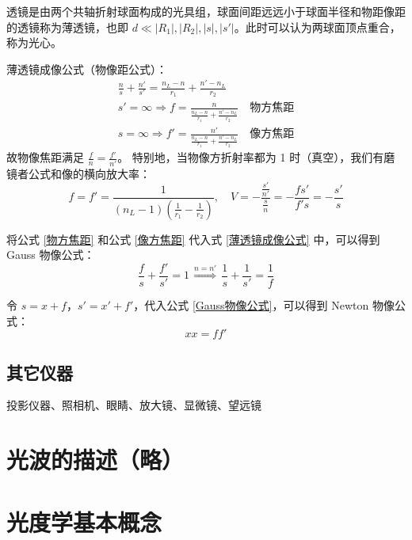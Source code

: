 \documentclass[UTF8]{report}
\theoremstyle{MyLineTheoremStyle} %
\theoremstyle{MyBlockTheoremStyle} %
\theoremstyle{MySubsubsectionStyle} %
\begin{document}
透镜是由两个共轴折射球面构成的光具组，球面间距远远小于球面半径和物距像距的透镜称为薄透镜，也即 $d \ll | R_1 |, | R_2 |, | s |, | s' |$。此时可以认为两球面顶点重合，称为光心。

薄透镜成像公式（物像距公式）：
\begin{gather} 
\frac{n}{s} + \frac{n'}{s'} = \frac{n_L - n}{r_1} + \frac{n' - n_L}{r_2} \label{薄透镜成像公式} \\
s' = \infty \Longrightarrow  f = \frac{n}{\frac{n_L - n}{r_1} + \frac{n' - n_L}{r_2}}\quad \text{物方焦距} \label{物方焦距} \\ 
s = \infty \Longrightarrow  f' = \frac{n'}{\frac{n_L - n}{r_1} + \frac{n' - n_L}{r_2}}\quad \text{像方焦距} \label{像方焦距}
\end{gather}
故物像焦距满足 $\frac{f}{n} = \frac{f'}{n'}$。
特别地，当物像方折射率都为 1 时（真空），我们有磨镜者公式和像的横向放大率：
\begin{equation}
f =f' = \frac{1}{(n_L - 1)(\frac{1}{r_1} - \frac{1}{r_2})},\quad  V = -\frac{\frac{s'}{n'}}{\frac{s}{n}} = -\frac{fs'}{f's} =  - \frac{s'}{s}
\end{equation}


将公式 \ref{物方焦距} 和公式 \ref{像方焦距} 代入式 \ref{薄透镜成像公式} 中，可以得到 Gauss 物像公式：
\begin{equation}
\frac{f}{s} + \frac{f'}{s'} = 1 \overset{n = n'}{\ \ \ \Longrightarrow\ \ \  } \frac{1}{s} + \frac{1}{s'} = \frac{1}{f}
\label{Gauss物像公式}
\end{equation}

令 $s = x + f$，$s' = x' + f'$，代入公式 \ref{Gauss物像公式}，可以得到 Newton 物像公式：
\begin{equation}
xx = ff'
\end{equation}


\subsection{其它仪器}
投影仪器、照相机、眼睛、放大镜、显微镜、望远镜

\section{光波的描述（略）}
\section{光度学基本概念}
\end{document}
